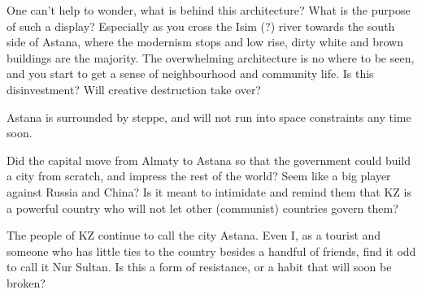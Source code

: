 \documentclass{article}
\begin{document}
One can't help to wonder, what is behind this architecture? What is the purpose of such a display? Especially as you cross the Isim (?) river towards the south side of Astana, where the modernism stops and low rise, dirty white and brown buildings are the majority. The overwhelming architecture is no where to be seen, and you start to get a sense of neighbourhood and community life. Is this disinvestment? Will creative destruction take over?

Astana is surrounded by steppe, and will not run into space constraints any time soon. 

Did the capital move from Almaty to Astana so that the government could build a city from scratch, and impress the rest of the world? Seem like a big player against Russia and China? Is it meant to intimidate and remind them that KZ is a powerful country who will not let other (communist) countries govern them? 


The people of KZ continue to call the city Astana. Even I, as a tourist and someone who has little ties to the country besides a handful of friends, find it odd to call it Nur Sultan. Is this a form of resistance, or a habit that will soon be broken?


\pagebreak

\printbibliography
\end{document}
